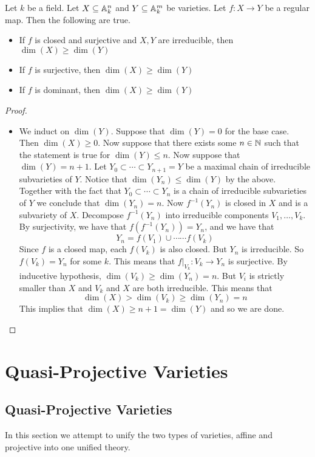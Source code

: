 \documentclass[a4paper]{article}
\begin{document}
\begin{prp}{}{} Let $k$ be a field. Let $X\subseteq\mathbb{A}_k^n$ and $Y\subseteq\mathbb{A}_k^m$ be varieties. Let $f:X\to Y$ be a regular map. Then the following are true. 
\begin{itemize}
\item If $f$ is closed and surjective and $X,Y$ are irreducible, then $\dim(X)\geq\dim(Y)$
\item If $f$ is surjective, then $\dim(X)\geq\dim(Y)$
\item If $f$ is dominant, then $\dim(X)\geq\dim(Y)$
\end{itemize} \tcbline
\begin{proof}~\\
\begin{itemize}
\item We induct on $\dim(Y)$. Suppose that $\dim(Y)=0$ for the base case. Then $\dim(X)\geq 0$. Now suppose that there exists some $n\in\mathbb{N}$ such that the statement is true for $\dim(Y)\leq n$. Now suppose that $\dim(Y)=n+1$. Let $Y_0\subset\cdots\subset Y_{n+1}=Y$ be a maximal chain of irreducible subvarieties of $Y$. Notice that $\dim(Y_n)\leq\dim(Y)$ by the above. Together with the fact that $Y_0\subset\cdots\subset Y_n$ is a chain of irreducible subvarieties of $Y$ we conclude that $\dim(Y_n)=n$. Now $f^{-1}(Y_n)$ is closed in $X$ and is a subvariety of $X$. Decompose $f^{-1}(Y_n)$ into irreducible components $V_1,\dots,V_k$. By surjectivity, we have that $f(f^{-1}(Y_n))=Y_n$, and we have that $$Y_n=f(V_1)\cup\cdots\cdots f(V_k)$$ Since $f$ is a closed map, each $f(V_k)$ is also closed. But $Y_n$ is irreducible. So $f(V_k)=Y_n$ for some $k$. This means that $f|_{V_k}:V_k\to Y_n$ is surjective. By inducetive hypothesis, $\dim(V_k)\geq\dim(Y_n)=n$. But $V_i$ is strictly smaller than $X$ and $V_k$ and $X$ are both irreducible. This means that $$\dim(X)>\dim(V_k)\geq\dim(Y_n)=n$$ This implies that $\dim(X)\geq n+1=\dim(Y)$ and so we are done. 
\end{itemize}
\end{proof}
\end{prp}

\pagebreak
\section{Quasi-Projective Varieties}
\subsection{Quasi-Projective Varieties}
In this section we attempt to unify the two types of varieties, affine and projective into one unified theory. 
\end{document}
